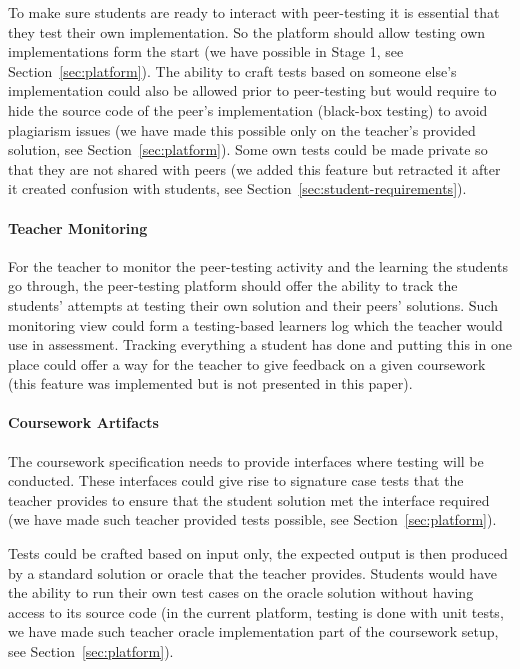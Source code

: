 \documentclass[sigplan,10pt,review]{acmart}\settopmatter{printfolios=true}
\begin{document}
To make sure students are ready to interact with peer-testing it is
essential that they test their own implementation. So the platform
should allow testing own implementations form the start (we have
possible in Stage 1, see Section~\ref{sec:platform}). The ability to
craft tests based on someone else's implementation could also be
allowed prior to peer-testing but would require to hide the source
code of the peer's implementation (black-box testing) to avoid
plagiarism issues (we have made this possible only on the teacher's
provided solution, see Section~\ref{sec:platform}). Some own tests
could be made private so that they are not shared with peers (we added
this feature but retracted it after it created confusion with
students, see Section~\ref{sec:student-requirements}).

\paragraph{Teacher Monitoring}

For the teacher to monitor the peer-testing activity and the learning
the students go through, the peer-testing platform should offer the
ability to track the students' attempts at testing their own solution
and their peers' solutions. Such monitoring view could form a
testing-based learners log which the teacher would use in assessment.
Tracking everything a student has done and putting this in one place
could offer a way for the teacher to give feedback on a given
coursework (this feature was implemented but is not presented in this
paper).

\paragraph{Coursework Artifacts}

The coursework specification needs to provide interfaces where testing
will be conducted. These interfaces could give rise to signature case
tests that the teacher provides to ensure that the student solution
met the interface required (we have made such teacher provided tests
possible, see Section~\ref{sec:platform}).

Tests could be crafted based on input only, the expected output is
then produced by a standard solution or oracle that the teacher
provides. Students would have the ability to run their own test cases
on the oracle solution without having access to its source code (in
the current platform, testing is done with unit tests, we have made
such teacher oracle implementation part of the coursework setup, see
Section~\ref{sec:platform}).
\end{document}
